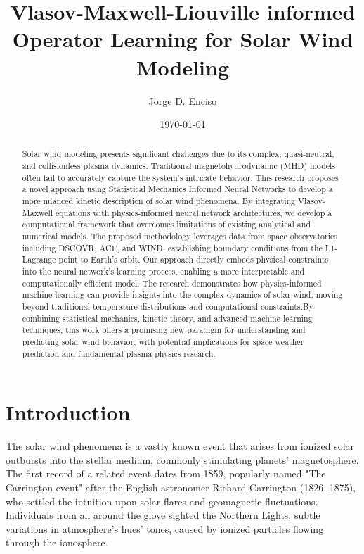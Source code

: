 \documentclass[12pt]{article}
\title{Vlasov-Maxwell-Liouville informed Operator Learning for Solar Wind Modeling}
\author{Jorge D. Enciso}
\date{\today}
\begin{document}
\maketitle

\begin{abstract}
    Solar wind modeling presents significant challenges due to its complex, quasi-neutral, and collisionless plasma dynamics. Traditional magnetohydrodynamic (MHD) models often fail to accurately capture the system's intricate behavior. This research proposes a novel approach using Statistical Mechanics Informed Neural Networks to develop a more nuanced kinetic description of solar wind phenomena. By integrating Vlasov-Maxwell equations with physics-informed neural network architectures, we develop a computational framework that overcomes limitations of existing analytical and numerical models. The proposed methodology leverages data from space observatories including DSCOVR, ACE, and WIND, establishing boundary conditions from the L1-Lagrange point to Earth's orbit. Our approach directly embeds physical constraints into the neural network's learning process, enabling a more interpretable and computationally efficient model. The research demonstrates how physics-informed machine learning can provide insights into the complex dynamics of solar wind, moving beyond traditional temperature distributions and computational constraints.By combining statistical mechanics, kinetic theory, and advanced machine learning techniques, this work offers a promising new paradigm for understanding and predicting solar wind behavior, with potential implications for space weather prediction and fundamental plasma physics research.
\end{abstract}

\tableofcontents
\newpage

\section{Introduction}

The solar wind phenomena is a vastly known event that arises from ionized solar outbursts into the stellar medium, commonly stimulating planets' magnetosphere. \cite{Gosling2007} The first record of a related event dates from 1859, popularly named "The Carrington event" after the English astronomer Richard Carrington (1826, 1875), who settled the intuition upon solar flares and geomagnetic fluctuations. Individuals from all around the glove sighted the Northern Lights, subtle variations in atmosphere's hues' tones, caused by ionized particles flowing through the ionosphere.
\end{document}

